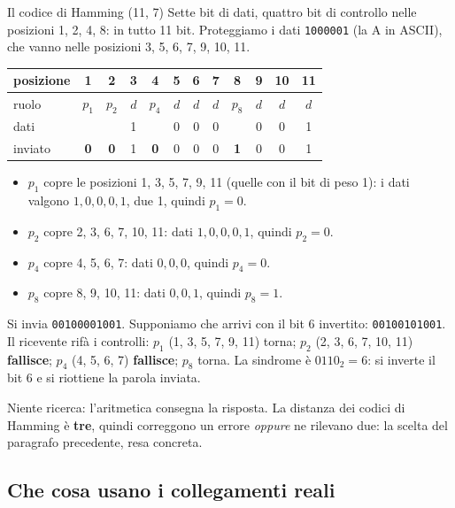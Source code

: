 \begin{esempio}{Il codice di Hamming (11, 7)}
Sette bit di dati, quattro bit di controllo nelle posizioni 1, 2, 4, 8: in tutto 11 bit. Proteggiamo i dati \texttt{1000001} (la A in
ASCII), che vanno nelle posizioni 3, 5, 6, 7, 9, 10, 11.
\begin{center}
\small
\begin{tabular}{l*{11}{c}}
\toprule
posizione & 1 & 2 & 3 & 4 & 5 & 6 & 7 & 8 & 9 & 10 & 11 \\
\midrule
ruolo & $p_1$ & $p_2$ & $d$ & $p_4$ & $d$ & $d$ & $d$ & $p_8$ & $d$ & $d$ & $d$ \\
dati & & & 1 & & 0 & 0 & 0 & & 0 & 0 & 1 \\
inviato & \textbf{0} & \textbf{0} & 1 & \textbf{0} & 0 & 0 & 0 & \textbf{1} & 0 & 0 & 1 \\
\bottomrule
\end{tabular}
\end{center}
\begin{itemize}
    \item $p_1$ copre le posizioni 1, 3, 5, 7, 9, 11 (quelle con il bit di peso 1): i dati valgono $1,0,0,0,1$, due 1, quindi
          $p_1 = 0$.
    \item $p_2$ copre 2, 3, 6, 7, 10, 11: dati $1,0,0,0,1$, quindi $p_2 = 0$.
    \item $p_4$ copre 4, 5, 6, 7: dati $0,0,0$, quindi $p_4 = 0$.
    \item $p_8$ copre 8, 9, 10, 11: dati $0,0,1$, quindi $p_8 = 1$.
\end{itemize}
Si invia \texttt{00100001001}. Supponiamo che arrivi con il bit 6 invertito: \texttt{00100\textcolor{netred}{1}01001}. Il ricevente
rifà i controlli: $p_1$ (1, 3, 5, 7, 9, 11) torna; $p_2$ (2, 3, 6, 7, 10, 11) \textbf{fallisce}; $p_4$ (4, 5, 6, 7)
\textbf{fallisce}; $p_8$ torna. La sindrome è $0110_2 = 6$: si inverte il bit 6 e si riottiene la parola inviata.
\end{esempio}

Niente ricerca: l'aritmetica consegna la risposta. La distanza dei codici di Hamming è \textbf{tre}, quindi correggono un errore
\emph{oppure} ne rilevano due: la scelta del paragrafo precedente, resa concreta.

\subsection{Che cosa usano i collegamenti reali}

